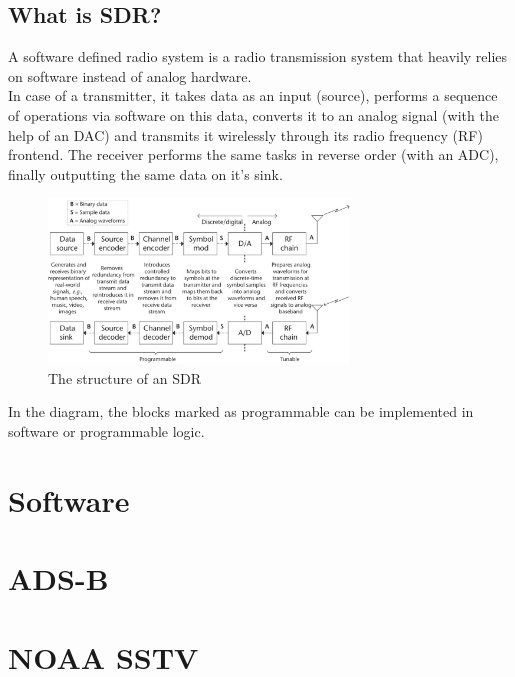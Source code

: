 \documentclass[conference]{IEEEtran}
\begin{document}
\subsection{What is SDR?}
A software defined radio system is a radio transmission system that heavily relies on software instead of analog hardware.\\
In case of a transmitter, it takes data as an input (source), performs a sequence of operations via software on this data, converts it to an analog signal (with the help of an DAC) and transmits it wirelessly through its radio frequency (RF) frontend. The receiver performs the same tasks in reverse order (with an ADC), finally outputting the same data on it's sink.
\begin{figure}[H]
	\centering
	\includegraphics[width=8cm]{forEngineers_SDR_structure}
	\caption{The structure of an SDR}
\end{figure}
In the diagram, the blocks marked as programmable can be implemented in software or programmable logic.\cite{wyglinski2018software}

\section{Software} %

\section{ADS-B}

\section{NOAA SSTV} %
\end{document}
